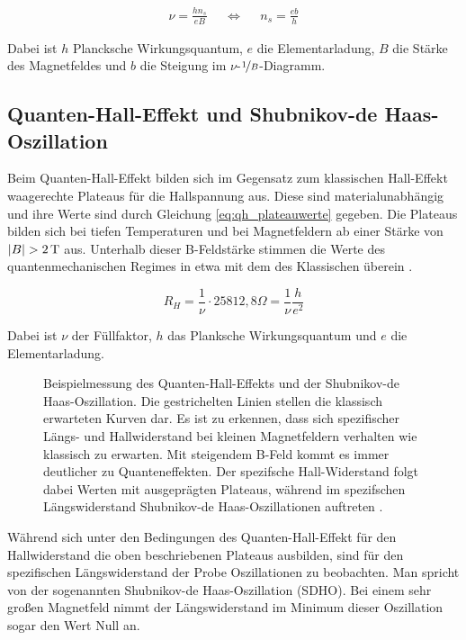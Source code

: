  \begin{align}
 	\nu = \frac{hn_s}{eB} & & \Leftrightarrow & & n_s = \frac{eb}{h}
 	\label{eq:sdh_osz_naeherung}
 \end{align}
 
Dabei ist $h$ Plancksche Wirkungsquantum, $e$ die Elementarladung, $B$ die Stärke des Magnetfeldes und $b$ die Steigung im $\nu$-$\nicefrac{1}{B}$-Diagramm.
 
 
 

\newpage
\subsection{Quanten-Hall-Effekt und Shubnikov-de Haas-Oszillation}

Beim Quanten-Hall-Effekt bilden sich im Gegensatz zum klassischen Hall-Effekt waagerechte Plateaus für die Hallspannung aus. Diese sind materialunabhängig und ihre Werte sind durch Gleichung \ref{eq:qh_plateauwerte} gegeben. Die Plateaus bilden sich bei tiefen Temperaturen und bei Magnetfeldern ab einer Stärke von $|B| > \unit[2]{T}$ aus. Unterhalb dieser B-Feldstärke stimmen die Werte des quantenmechanischen Regimes in etwa mit dem des Klassischen überein \cite[Kap.3.6]{kopitzki_einfuhrung_2009}.

\begin{equation}
R_H=\frac{1}{\nu}\cdot 25812,8\Omega =\frac{1}{\nu} \frac{h}{e^2}
\label{eq:qh_plateauwerte}
\end{equation}

Dabei ist $\nu$ der Füllfaktor, $h$ das Planksche Wirkungsquantum und $e$ die Elementarladung. 

\begin{figure}[h]
	\centering
	\caption[Beispiel-Messung Hall-Plateaus und SDH-Oszillation]{Beispielmessung des Quanten-Hall-Effekts und der Shubnikov-de Haas-Oszillation. Die gestrichelten Linien stellen die klassisch erwarteten Kurven dar. Es ist zu erkennen, dass sich spezifischer Längs- und Hallwiderstand bei kleinen Magnetfeldern verhalten wie klassisch zu erwarten. Mit steigendem B-Feld kommt es immer deutlicher zu Quanteneffekten. Der spezifsche Hall-Widerstand folgt dabei Werten mit ausgeprägten Plateaus, während im spezifschen Längswiderstand Shubnikov-de Haas-Oszillationen auftreten \cite{anleitung}.}
	\label{fig:QH_Bsp_Messung_Anleitungsheft}
\end{figure}

Während sich unter den Bedingungen des Quanten-Hall-Effekt für den Hallwiderstand die oben beschriebenen Plateaus ausbilden, sind für den spezifischen Längswiderstand der Probe Oszillationen zu beobachten. Man spricht von der sogenannten Shubnikov-de Haas-Oszillation (SDHO). Bei einem sehr großen Magnetfeld nimmt der Längswiderstand im Minimum dieser Oszillation sogar den Wert Null an.

